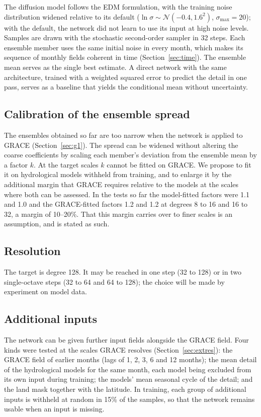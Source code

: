 \documentclass[11pt,a4paper]{article}
\begin{document}
The diffusion model follows the EDM formulation, with the training noise distribution widened
relative to its default ($\ln\sigma \sim \mathcal N(-0.4, 1.6^2)$, $\sigma_\mathrm{max} = 20$);
with the default, the network did not learn to use its input at high noise levels. Samples
are drawn with the stochastic second-order sampler in 32 steps. Each ensemble member uses the
same initial noise in every month, which makes its sequence of monthly fields coherent in time
(Section~\ref{sec:time}). The ensemble mean serves as the single best estimate. A direct network with the same architecture, trained with a weighted
squared error to predict the detail in one pass, serves as a baseline that yields the
conditional mean without uncertainty.

\subsection{Calibration of the ensemble spread}\label{sec:calib}
The ensembles obtained so far are too narrow when the network is applied to GRACE
(Section~\ref{sec:g1}). The spread can be widened without altering the coarse coefficients by
scaling each member's deviation from the ensemble mean by a factor $k$. At the target scales
$k$ cannot be fitted on GRACE. We propose to fit it on hydrological models withheld from
training, and to enlarge it by the additional margin that GRACE requires relative to the
models at the scales where both can be assessed. In the tests so far the model-fitted factors
were 1.1 and 1.0 and the GRACE-fitted factors 1.2 and 1.2 at degrees 8 to 16 and 16 to 32, a
margin of 10--20\%. That this margin carries over to finer scales is an assumption, and is
stated as such.

\subsection{Resolution}
The target is degree 128. It may be reached in one step (32 to 128) or in two single-octave
steps (32 to 64 and 64 to 128); the choice will be made by experiment on model data.

\subsection{Additional inputs}\label{sec:ext}
The network can be given further input fields alongside the GRACE field. Four kinds were
tested at the scales GRACE resolves (Section~\ref{sec:extres}): the GRACE field of earlier
months (lags of 1, 2, 3, 6 and 12 months); the mean detail of the hydrological models for the
same month, each model being excluded from its own input during training; the models' mean
seasonal cycle of the detail; and the land mask together with the latitude. In training, each
group of additional inputs is withheld at random in 15\% of the samples, so that the network
remains usable when an input is missing.
\end{document}
